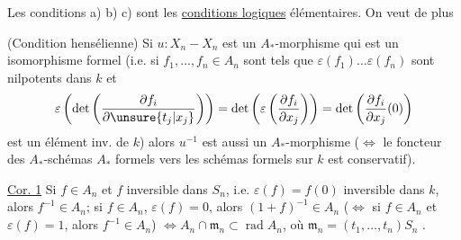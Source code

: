 
Les conditions a) b) c) sont les \uline{conditions logiques} élémentaires. On veut de plus

 (Condition hensélienne) Si $u:X_n\mathbin{-}X_n$ est un $A_*$-morphisme qui est un isomorphisme formel (i.e. si $f_1,\ldots,f_n\in A_n$ sont tels que $\varepsilon(f_1)\ldots\varepsilon(f_n)$ sont nilpotents dans $k$ et
\[
\varepsilon\left(\det\left(\frac{\partial f_i}{\partial\unsure{t_j|x_j}}\right)\right)
=\det\left(\varepsilon\left(\frac{\partial f_i}{\partial x_j}\right)\right)
=\det\left(\frac{\partial f_i}{\partial x_j}(0)\right)
\]
est un élément inv. de $k$) alors $u^{-1}$ est aussi un $A_*$-morphisme ($\Leftrightarrow$ le foncteur des $A_*$-schémas $A_*$ formels vers les schémas formels sur $k$ est conservatif).

\uline{Cor. 1} Si $f\in A_n$ et $f$ inversible dans $S_n$, i.e. $\varepsilon(f)=f(0)$ inversible dans $k$, alors $f^{-1}\in A_n$;  si $f\in A_n$, $\varepsilon(f)=0$, alors $(1+f)^{-1}\in A_n$ ($\Leftrightarrow$ si $f\in A_n$ et $\varepsilon(f)=1$, alors $f^{-1}\in A_n$) $\Leftrightarrow A_n\cap\mathfrak m_n\subset\operatorname{rad}A_n$, où  $\mathfrak m_n=(t_1,\ldots,t_n)S_n$ .

